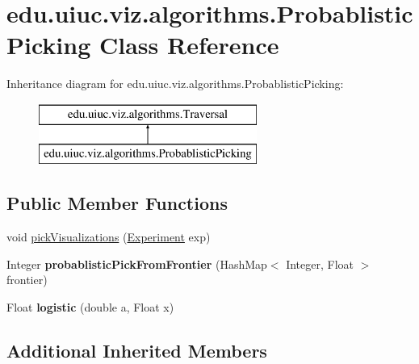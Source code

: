 \hypertarget{classedu_1_1uiuc_1_1viz_1_1algorithms_1_1_probablistic_picking}{}\section{edu.\+uiuc.\+viz.\+algorithms.\+Probablistic\+Picking Class Reference}
\label{classedu_1_1uiuc_1_1viz_1_1algorithms_1_1_probablistic_picking}
Inheritance diagram for edu.\+uiuc.\+viz.\+algorithms.\+Probablistic\+Picking\+:\begin{figure}[H]
\begin{center}
\leavevmode
\includegraphics[height=2.000000cm]{classedu_1_1uiuc_1_1viz_1_1algorithms_1_1_probablistic_picking}
\end{center}
\end{figure}
\subsection*{Public Member Functions}
\begin{DoxyCompactItemize}
\item 
void \mbox{\hyperlink{classedu_1_1uiuc_1_1viz_1_1algorithms_1_1_probablistic_picking_a9166d3fa8f4f1057ecbd343fae327362}{pick\+Visualizations}} (\mbox{\hyperlink{classedu_1_1uiuc_1_1viz_1_1algorithms_1_1_experiment}{Experiment}} exp)
\item 
\mbox{\label{classedu_1_1uiuc_1_1viz_1_1algorithms_1_1_probablistic_picking_a86577521147dcf7928e4c4421024b34c}} 
Integer {\bfseries probablistic\+Pick\+From\+Frontier} (Hash\+Map$<$ Integer, Float $>$ frontier)
\item 
\mbox{\label{classedu_1_1uiuc_1_1viz_1_1algorithms_1_1_probablistic_picking_a78e5c7b529ac2cf441c2b9eb3e9746b7}} 
Float {\bfseries logistic} (double a, Float x)
\end{DoxyCompactItemize}
\subsection*{Additional Inherited Members}


